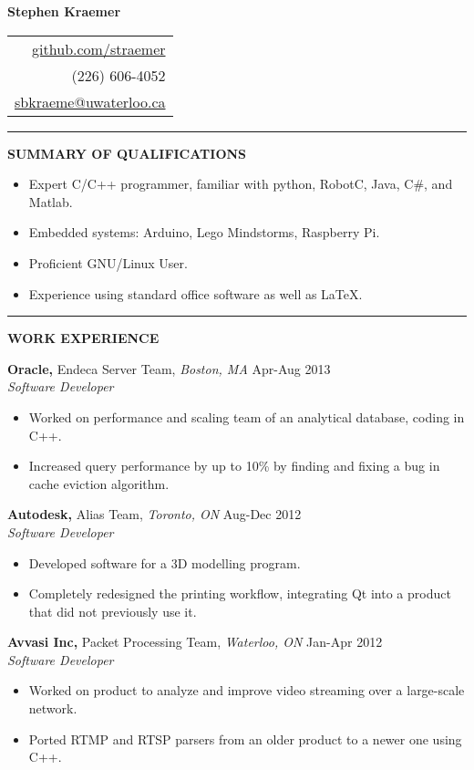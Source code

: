 \documentclass{letter}
\begin{document}
{\Huge\bf Stephen Kraemer} \hfill
\begin{tabular}{r}
  \href{https://github.com/straemer}{github.com/straemer} \\
  (226) 606-4052 \\
  \href{mailto:sbkraeme@uwaterloo.ca}{sbkraeme@uwaterloo.ca}
\end{tabular}

\vskip 2pt
\hrule

{\large\bf SUMMARY OF QUALIFICATIONS}

\begin{itemize}
  \item Expert C/C++ programmer, familiar with python, RobotC, Java, C\#, and Matlab.
  \item Embedded systems: Arduino, Lego Mindstorms, Raspberry Pi.
  \item Proficient GNU/Linux User.
  \item Experience using standard office software as well as LaTeX.
\end{itemize}

\vskip 2pt
\hrule
{\large\bf WORK EXPERIENCE}

{\bf Oracle,} Endeca Server Team, {\sl Boston, MA} \hfill Apr-Aug 2013 \\
{\sl Software Developer}
\begin{itemize}
  \item Worked on performance and scaling team of an analytical database, coding in C++.
  \item Increased query performance by up to 10\% by finding and fixing a bug in cache eviction algorithm.
\end{itemize}

{\bf Autodesk,} Alias Team, {\sl Toronto, ON} \hfill Aug-Dec 2012 \\
{\sl Software Developer}
\begin{itemize}
  \item Developed software for a 3D modelling program.
  \item Completely redesigned the printing workflow, integrating Qt into a product that did not previously use it.
\end{itemize}

{\bf Avvasi Inc,} Packet Processing Team, {\sl Waterloo, ON} \hfill Jan-Apr 2012 \\
{\sl Software Developer}
\begin{itemize}
  \item Worked on product to analyze and improve video streaming over a large-scale network.
  \item Ported RTMP and RTSP parsers from an older product to a newer one using C++.
\end{itemize}
\end{document}
